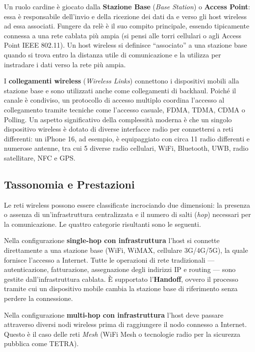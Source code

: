 \documentclass[
  italian,
  openany]{book}
\begin{document}
Un ruolo cardine è giocato dalla \textbf{Stazione Base} (\emph{Base
Station}) o \textbf{Access Point}: essa è responsabile dell'invio e
della ricezione dei dati da e verso gli host wireless ad essa associati.
Fungere da relè è il suo compito principale, essendo tipicamente
connessa a una rete cablata più ampia (si pensi alle torri cellulari o
agli Access Point IEEE 802.11). Un host wireless si definisce
``associato'' a una stazione base quando si trova entro la distanza
utile di comunicazione e la utilizza per instradare i dati verso la rete
più ampia.

I \textbf{collegamenti wireless} (\emph{Wireless Links}) connettono i
dispositivi mobili alla stazione base e sono utilizzati anche come
collegamenti di backhaul. Poiché il canale è condiviso, un protocollo di
accesso multiplo coordina l'accesso al collegamento tramite tecniche
come l'accesso casuale, FDMA, TDMA, CDMA o Polling. Un aspetto
significativo della complessità moderna è che un singolo dispositivo
wireless è dotato di diverse interfacce radio per connettersi a reti
differenti: un iPhone 16, ad esempio, è equipaggiato con circa 11 radio
differenti e numerose antenne, tra cui 5 diverse radio cellulari, WiFi,
Bluetooth, UWB, radio satellitare, NFC e GPS.

\subsection{Tassonomia e Prestazioni}\label{tassonomia-e-prestazioni}

Le reti wireless possono essere classificate incrociando due dimensioni:
la presenza o assenza di un'infrastruttura centralizzata e il numero di
salti (\emph{hop}) necessari per la comunicazione. Le quattro categorie
risultanti sono le seguenti.

Nella configurazione \textbf{single-hop con infrastruttura} l'host si
connette direttamente a una stazione base (WiFi, WiMAX, cellulare
3G/4G/5G), la quale fornisce l'accesso a Internet. Tutte le operazioni
di rete tradizionali --- autenticazione, fatturazione, assegnazione
degli indirizzi IP e routing --- sono gestite dall'infrastruttura
cablata. È supportato l'\textbf{Handoff}, ovvero il processo tramite cui
un dispositivo mobile cambia la stazione base di riferimento senza
perdere la connessione.

Nella configurazione \textbf{multi-hop con infrastruttura} l'host deve
passare attraverso diversi nodi wireless prima di raggiungere il nodo
connesso a Internet. Questo è il caso delle reti \emph{Mesh} (WiFi Mesh
o tecnologie radio per la sicurezza pubblica come TETRA).
\end{document}
